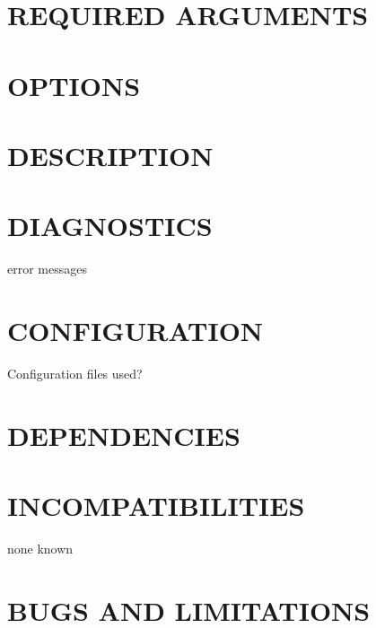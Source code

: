 \documentclass{book}
\begin{document}
\section{REQUIRED ARGUMENTS}
\label{_REQUIRED_ARGUMENTS}
\hypertarget{_REQUIRED_ARGUMENTS}{}


\section{OPTIONS}
\label{_OPTIONS}
\hypertarget{_OPTIONS}{}


\section{DESCRIPTION}
\label{_DESCRIPTION}
\hypertarget{_DESCRIPTION}{}


\section{DIAGNOSTICS}
\label{_DIAGNOSTICS}
\hypertarget{_DIAGNOSTICS}{}



error messages


\section{CONFIGURATION}
\label{_CONFIGURATION}
\hypertarget{_CONFIGURATION}{}



Configuration files used?


\section{DEPENDENCIES}
\label{_DEPENDENCIES}
\hypertarget{_DEPENDENCIES}{}


\section{INCOMPATIBILITIES}
\label{_INCOMPATIBILITIES}
\hypertarget{_INCOMPATIBILITIES}{}



none known


\section{BUGS AND LIMITATIONS}
\label{_BUGS_AND_LIMITATIONS}
\hypertarget{_BUGS_AND_LIMITATIONS}{}
\end{document}
